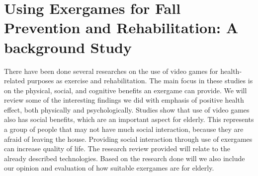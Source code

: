 \section{Using Exergames for Fall Prevention and Rehabilitation: A background Study}
There have been done several researches on the use of video games for health-related purposes as exercise and rehabilitation. The main focus in these studies is on the physical, social, and cognitive benefits an exergame can provide. We will review some of the interesting findings we did with emphasis of positive health effect, both physically and psychologically. Studies show that use of video games also has social benefits, which are an important aspect for elderly. This represents a group of people that may not have much social interaction, because they are afraid of leaving the house. Providing social interaction through use of exergames can increase quality of life. The research review provided will relate to the already described technologies. Based on the research done will we also include our opinion and evaluation of how suitable exergames are for elderly. \\ \\
